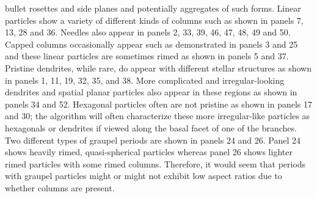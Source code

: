 \documentclass[amt, manuscript]{copernicus}
\begin{document}
bullet rosettes and side planes and potentially aggregates of such forms. Linear particles show a variety of different kinds of columns such as shown in panels 7, 13, 28 and 36. Needles also appear in panels 2, 33, 39, 46, 47, 48, 49 and 50. Capped columns occasionally appear such as demonstrated in panels 3 and 25 and these linear particles are sometimes rimed as shown in panels 5 and 37. Pristine dendrites, while rare, do appear with different stellar structures as shown in panels 1, 11, 19, 32, 35, and 38. More complicated and irregular-looking dendrites and spatial planar particles also appear in these regions as shown in panels 34 and 52. Hexagonal particles often are not pristine as shown in panels 17 and 30; the \citet{Schima2024} algorithm will often characterize these more irregular-like particles as hexagonals or dendrites if viewed along the basal facet of one of the branches. Two different types of graupel periods are shown in panels 24 and 26. Panel 24 shows heavily rimed, quasi-spherical particles whereas panel 26 shows lighter rimed particles with some rimed columns. Therefore, it would seem that periods with graupel particles might or might not exhibit low aspect ratios due to whether columns are present.
\end{document}
